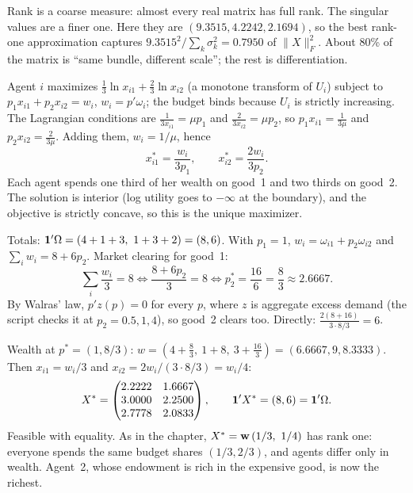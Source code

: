 \documentclass[../solutions_manual.tex]{subfiles}
\begin{document}
Rank is a coarse measure: almost every real matrix has full rank. The singular values are a finer one. Here they are $(9.3515, 4.2242, 2.1694)$, so the best rank-one approximation captures $9.3515^2/\sum_k\sigma_k^2 = 0.7950$ of $\|X\|_F^2$. About 80\% of the matrix is ``same bundle, different scale''; the rest is differentiation.


 Agent $i$ maximizes $\frac13\ln x_{i1} + \frac23\ln x_{i2}$ (a monotone transform of $U_i$) subject to $p_1x_{i1} + p_2x_{i2} = w_i$, $w_i = p'\omega_i$; the budget binds because $U_i$ is strictly increasing. The Lagrangian conditions are $\frac{1}{3x_{i1}} = \mu p_1$ and $\frac{2}{3x_{i2}} = \mu p_2$, so $p_1x_{i1} = \frac{1}{3\mu}$ and $p_2x_{i2} = \frac{2}{3\mu}$. Adding them, $w_i = 1/\mu$, hence
\[
x_{i1}^* = \frac{w_i}{3p_1}, \qquad x_{i2}^* = \frac{2w_i}{3p_2}.
\]
Each agent spends one third of her wealth on good~1 and two thirds on good~2. The solution is interior (log utility goes to $-\infty$ at the boundary), and the objective is strictly concave, so this is the unique maximizer.

 Totals: $\mathbf{1}'\Omega = (4+1+3,\ 1+3+2) = (8, 6)$. With $p_1 = 1$, $w_i = \omega_{i1} + p_2\omega_{i2}$ and $\sum_i w_i = 8 + 6p_2$. Market clearing for good~1:
\[
\sum_i \frac{w_i}{3} = 8 \iff \frac{8 + 6p_2}{3} = 8 \iff p_2^* = \frac{16}{6} = \frac{8}{3} \approx 2.6667.
\]
By Walras' law, $p'z(p) = 0$ for every $p$, where $z$ is aggregate excess demand (the script checks it at $p_2 = 0.5, 1, 4$), so good~2 clears too. Directly: $\frac{2(8 + 16)}{3 \cdot 8/3} = 6$.

 Wealth at $p^* = (1, 8/3)$: $w = (4 + \frac83,\ 1 + 8,\ 3 + \frac{16}{3}) = (6.6667, 9, 8.3333)$. Then $x_{i1} = w_i/3$ and $x_{i2} = 2w_i/(3 \cdot 8/3) = w_i/4$:
\[
X^* = \begin{pmatrix} 2.2222 & 1.6667 \\ 3.0000 & 2.2500 \\ 2.7778 & 2.0833 \end{pmatrix}, \qquad \mathbf{1}'X^* = (8, 6) = \mathbf{1}'\Omega .
\]
Feasible with equality. As in the chapter, $X^* = \mathbf{w}\,(1/3,\ 1/4)$ has rank one: everyone spends the same budget shares $(1/3, 2/3)$, and agents differ only in wealth. Agent~2, whose endowment is rich in the expensive good, is now the richest.

\end{document}
